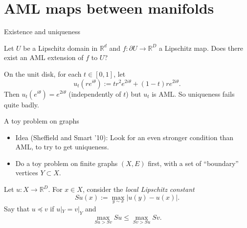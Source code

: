 \documentclass[10pt]{beamer}
\newcommand{\RR}{\mathbb{R}}
\begin{document}
\section{AML maps between manifolds}
\begin{frame}{Existence and uniqueness}
\begin{problem}
Let $U$ be a Lipschitz domain in $\RR^d$ and $f: \partial U \to \RR^D$ a Lipschitz map.
Does there exist an AML extension of $f$ to $U$?
\end{problem}

\begin{example}
On the unit disk, for each $t \in [0, 1]$, let
$$u_t(re^{i\theta}) := tr^2e^{2i\theta} + (1 - t) re^{2i\theta}.$$
Then $u_t(e^{i\theta}) = e^{2i\theta}$ (independently of $t$) but $u_t$ is AML.
So uniqueness fails quite badly.
\end{example}
\end{frame}

\begin{frame}{A toy problem on graphs}
\begin{itemize}
    \item Idea (Sheffield and Smart '10): Look for an even stronger condition than AML, to try to get uniqueness.
    \item Do a toy problem on finite graphs $(X, E)$ first, with a set of ``boundary'' vertices $Y \subset X$.
\end{itemize}

\begin{definition}
Let $u: X \to \RR^D$. For $x \in X$, consider the \emph{local Lipschitz constant}
$$Su(x) := \max_{y \sim x} |u(y) - u(x)|.$$
Say that $u \preceq v$ if $u|_Y = v|_Y$ and
$$\max_{Su > Sv} Su \leq \max_{Sv > Su} Sv.$$
\end{definition}
\end{frame}
\end{document}
